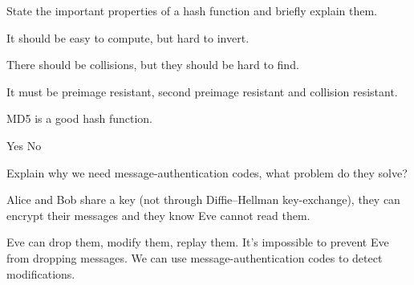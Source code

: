 \question[3]
State the important properties of a hash function and briefly explain them.

\begin{solution}
  It should be easy to compute, but hard to invert.

  There should be collisions, but they should be hard to find.

  It must be preimage resistant, second preimage resistant and collision 
  resistant.
\end{solution}


\question
MD5 is a good hash function.
\begin{oneparchoices}
  \choice Yes
  \CorrectChoice No
\end{oneparchoices}


\question[3]
Explain why we need message-authentication codes, what problem do they solve?

\begin{solution}
  Alice and Bob share a key (not through Diffie--Hellman key-exchange), they 
  can encrypt their messages and they know Eve cannot read them.

  Eve can drop them, modify them, replay them.
  It's impossible to prevent Eve from dropping messages.
  We can use message-authentication codes to detect modifications.
\end{solution}
